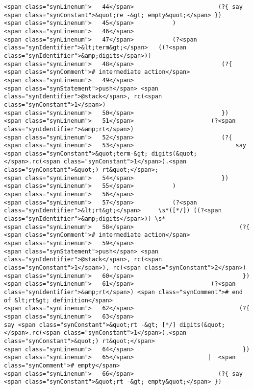\begin{verbatim}
<span class="synLinenum">   44</span>                        (?{ say <span class="synConstant">&quot;re -&gt; empty&quot;</span> })
<span class="synLinenum">   45</span>           )
<span class="synLinenum">   46</span> 
<span class="synLinenum">   47</span>           (?<span class="synIdentifier">&lt;term&gt;</span>   ((?<span class="synIdentifier">&amp;digits</span>))
<span class="synLinenum">   48</span>                         (?{ <span class="synComment"># intermediate action</span>
<span class="synLinenum">   49</span>                             <span class="synStatement">push</span> <span class="synIdentifier">@stack</span>, rc(<span class="synConstant">1</span>)
<span class="synLinenum">   50</span>                         })
<span class="synLinenum">   51</span>                      (?<span class="synIdentifier">&amp;rt</span>)
<span class="synLinenum">   52</span>                         (?{
<span class="synLinenum">   53</span>                             say <span class="synConstant">&quot;term-&gt; digits(&quot;</span>.rc(<span class="synConstant">1</span>).<span class="synConstant">&quot;) rt&quot;</span>;
<span class="synLinenum">   54</span>                         })
<span class="synLinenum">   55</span>           )
<span class="synLinenum">   56</span> 
<span class="synLinenum">   57</span>           (?<span class="synIdentifier">&lt;rt&gt;</span>     \s*([*/]) ((?<span class="synIdentifier">&amp;digits</span>)) \s*
<span class="synLinenum">   58</span>                              (?{  <span class="synComment"># intermediate action</span>
<span class="synLinenum">   59</span>                                   <span class="synStatement">push</span> <span class="synIdentifier">@stack</span>, rc(<span class="synConstant">1</span>), rc(<span class="synConstant">2</span>)
<span class="synLinenum">   60</span>                               })
<span class="synLinenum">   61</span>                      (?<span class="synIdentifier">&amp;rt</span>) <span class="synComment"># end of &lt;rt&gt; definition</span>
<span class="synLinenum">   62</span>                              (?{
<span class="synLinenum">   63</span>                                   say <span class="synConstant">&quot;rt -&gt; [*/] digits(&quot;</span>.rc(<span class="synConstant">1</span>).<span class="synConstant">&quot;) rt&quot;</span>
<span class="synLinenum">   64</span>                               })
<span class="synLinenum">   65</span>                     |  <span class="synComment"># empty</span>
<span class="synLinenum">   66</span>                        (?{ say <span class="synConstant">&quot;rt -&gt; empty&quot;</span> })

\end{verbatim}
